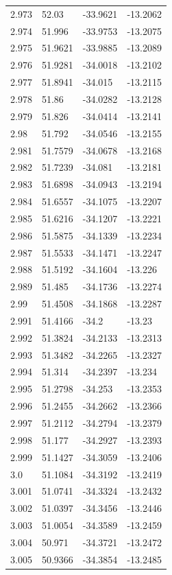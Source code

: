 \begin{tabular}{llll}
2.973 & 52.03 & -33.9621 & -13.2062 \\
2.974 & 51.996 & -33.9753 & -13.2075 \\
2.975 & 51.9621 & -33.9885 & -13.2089 \\
2.976 & 51.9281 & -34.0018 & -13.2102 \\
2.977 & 51.8941 & -34.015 & -13.2115 \\
2.978 & 51.86 & -34.0282 & -13.2128 \\
2.979 & 51.826 & -34.0414 & -13.2141 \\
2.98 & 51.792 & -34.0546 & -13.2155 \\
2.981 & 51.7579 & -34.0678 & -13.2168 \\
2.982 & 51.7239 & -34.081 & -13.2181 \\
2.983 & 51.6898 & -34.0943 & -13.2194 \\
2.984 & 51.6557 & -34.1075 & -13.2207 \\
2.985 & 51.6216 & -34.1207 & -13.2221 \\
2.986 & 51.5875 & -34.1339 & -13.2234 \\
2.987 & 51.5533 & -34.1471 & -13.2247 \\
2.988 & 51.5192 & -34.1604 & -13.226 \\
2.989 & 51.485 & -34.1736 & -13.2274 \\
2.99 & 51.4508 & -34.1868 & -13.2287 \\
2.991 & 51.4166 & -34.2 & -13.23 \\
2.992 & 51.3824 & -34.2133 & -13.2313 \\
2.993 & 51.3482 & -34.2265 & -13.2327 \\
2.994 & 51.314 & -34.2397 & -13.234 \\
2.995 & 51.2798 & -34.253 & -13.2353 \\
2.996 & 51.2455 & -34.2662 & -13.2366 \\
2.997 & 51.2112 & -34.2794 & -13.2379 \\
2.998 & 51.177 & -34.2927 & -13.2393 \\
2.999 & 51.1427 & -34.3059 & -13.2406 \\
3.0 & 51.1084 & -34.3192 & -13.2419 \\
3.001 & 51.0741 & -34.3324 & -13.2432 \\
3.002 & 51.0397 & -34.3456 & -13.2446 \\
3.003 & 51.0054 & -34.3589 & -13.2459 \\
3.004 & 50.971 & -34.3721 & -13.2472 \\
3.005 & 50.9366 & -34.3854 & -13.2485 \\

\end{tabular}
